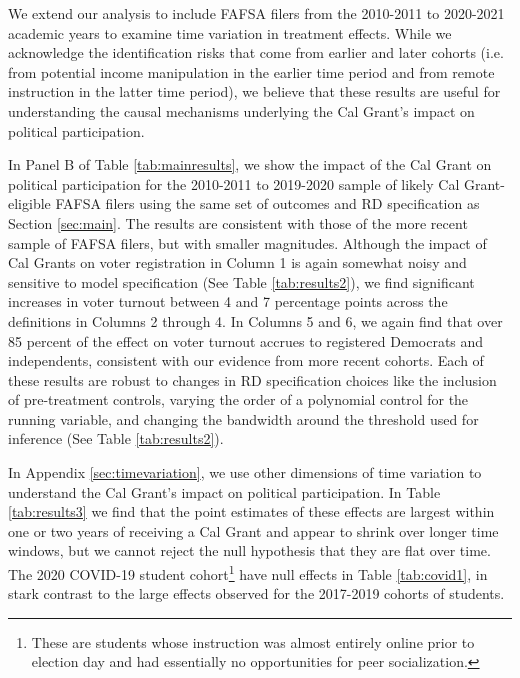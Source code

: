 \documentclass[12pt,letterpaper,oneside]{book}
\begin{document}
We extend our analysis to include FAFSA filers from the 2010-2011 to 2020-2021 academic years to examine time variation in treatment effects. While we acknowledge the identification risks that come from earlier and later cohorts (i.e. from potential income manipulation in the earlier time period and from remote instruction in the latter time period), we believe that these results are useful for understanding the causal mechanisms underlying the Cal Grant's impact on political participation.

In Panel B of Table \ref{tab:mainresults}, we show the impact of the Cal Grant on political participation for the 2010-2011 to 2019-2020 sample of likely Cal Grant-eligible FAFSA filers using the same set of outcomes and RD specification as Section \ref{sec:main}. The results are consistent with those of the more recent sample of FAFSA filers, but with smaller magnitudes. Although the impact of Cal Grants on voter registration in Column 1 is again somewhat noisy and sensitive to model specification (See Table \ref{tab:results2}), we find significant increases in voter turnout between 4 and 7 percentage points across the definitions in Columns 2 through 4. In Columns 5 and 6, we again find that over 85 percent of the effect on voter turnout accrues to registered Democrats and independents, consistent with our evidence from more recent cohorts. Each of these results are robust to changes in RD specification choices like the inclusion of pre-treatment controls, varying the order of a polynomial control for the running variable, and changing the bandwidth around the threshold used for inference (See Table \ref{tab:results2}).

In Appendix \ref{sec:timevariation}, we use other dimensions of time variation to understand the Cal Grant's impact on political participation. In Table \ref{tab:results3} we find that the point estimates of these effects are largest within one or two years of receiving a Cal Grant and appear to shrink over longer time windows, but we cannot reject the null hypothesis that they are flat over time. The 2020 COVID-19 student cohort\footnote{These are students whose instruction was almost entirely online prior to election day and had essentially no opportunities for peer socialization.} have null effects in Table \ref{tab:covid1}, in stark contrast to the large effects observed for the 2017-2019 cohorts of students.
\end{document}
